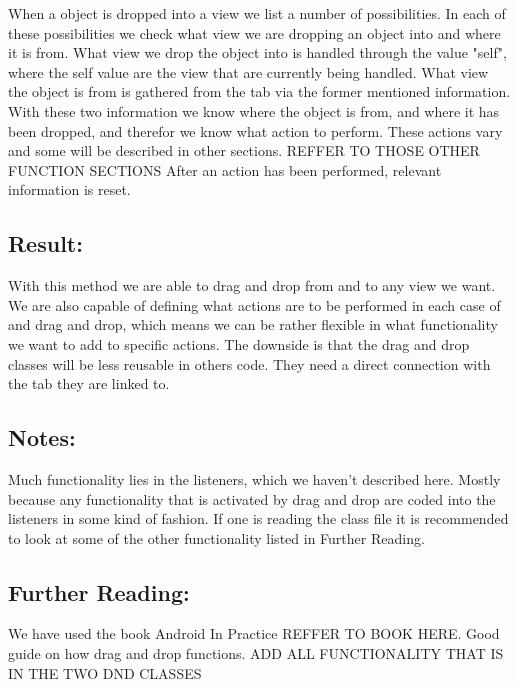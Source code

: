 
When a object is dropped into a view we list a number of possibilities. 
In each of these possibilities we check what view we are dropping an object into and where it is from. What view we drop the object into is handled through the value "self", where the self value are the view that are currently being handled. 
What view the object is from is gathered from the tab via the former mentioned information. 
With these two information we know where the object is from, and where it has been dropped, and therefor we know what action to perform. 
These actions vary and some will be described in other sections. REFFER TO THOSE OTHER FUNCTION SECTIONS 
After an action has been performed, relevant information is reset.

\subsection*{Result:}
With this method we are able to drag and drop from and to any view we want. 
We are also capable of defining what actions are to be performed in each case of and drag and drop, which means we can be rather flexible in what functionality we want to add to specific actions. 
The downside is that the drag and drop classes will be less reusable in others code. 
They need a direct connection with the tab they are linked to.


\subsection*{Notes:}
Much functionality lies in the listeners, which we haven't described here. Mostly because any functionality that is activated by drag and drop are coded into the listeners in some kind of fashion. If one is reading the class file it is recommended to look at some of the other functionality listed in Further Reading.


\subsection*{Further Reading:}
We have used the book Android In Practice REFFER TO BOOK HERE. Good guide on how drag and drop functions.
ADD ALL FUNCTIONALITY THAT IS IN THE TWO DND CLASSES